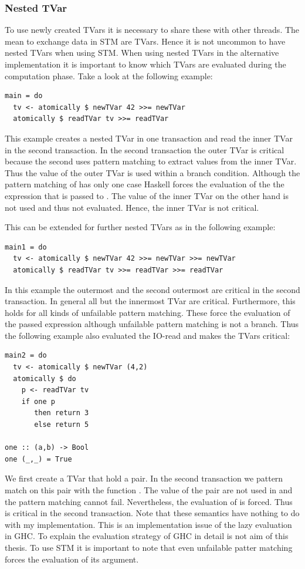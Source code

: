 \subsubsection{Nested TVar}
To use newly created TVars it is necessary to share these with other threads. The mean to exchange data in STM 
are TVars. Hence it is not uncommon to have nested TVars when using STM. When using nested TVars in the alternative
implementation it is important to know which TVars are evaluated during the computation phase. Take a look at the 
following example:
\begin{lstlisting}
main = do
  tv <- atomically $ newTVar 42 >>= newTVar 
  atomically $ readTVar tv >>= readTVar 
\end{lstlisting}
This example creates a nested TVar in one transaction and read the inner TVar in the second transaction. In the second
transaction the outer TVar is critical because the second  uses pattern matching to extract values from 
the inner TVar. Thus the value of the outer TVar is used within a branch condition. Although the pattern matching
of  has only one case Haskell forces the evaluation of the the expression that is passed to .
The value of the inner TVar on the other hand is not used and thus not evaluated. Hence, the inner TVar is not critical.

This can be extended for further nested TVars as in the following example:
\begin{lstlisting}
main1 = do
  tv <- atomically $ newTVar 42 >>= newTVar >>= newTVar 
  atomically $ readTVar tv >>= readTVar >>= readTVar 
\end{lstlisting}
In this example the outermost and the second outermost are critical in the second transaction. In general all but the 
innermost TVar are critical. Furthermore, this holds for all kinds of unfailable pattern matching. These force the 
evaluation of the passed expression although unfailable pattern matching is not a branch. Thus the following example
also evaluated the IO-read and makes the TVars critical:
\begin{lstlisting}
main2 = do
  tv <- atomically $ newTVar (4,2)
  atomically $ do
    p <- readTVar tv
    if one p
       then return 3
       else return 5
 
one :: (a,b) -> Bool
one (_,_) = True
\end{lstlisting}
We first create a TVar that hold a pair. In the second transaction we pattern match on this pair with the function .
The value of the pair are not used in  and the pattern matching cannot fail. Nevertheless, the evaluation of 
is forced. Thus  is critical in the second transaction. Note that these semantics have nothing to do with my implementation.
This is an implementation issue of the lazy evaluation in GHC. To explain the evaluation strategy of GHC in detail is not aim
of this thesis. To use STM it is important to note that even unfailable patter matching forces the evaluation of its argument.



